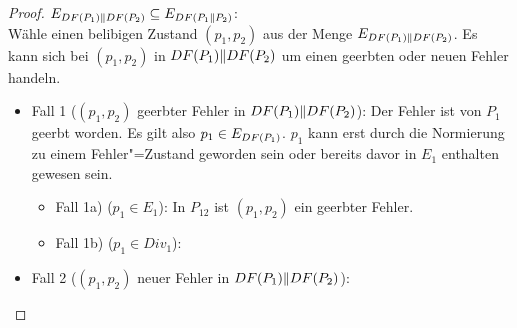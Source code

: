 \begin{proof}
  $E_{DF (P_1)\| DF (P_2)} \subseteq E_{DF (P_1\|P_2)}$:\\
  Wähle einen belibigen Zustand $(p_1,p_2)$ aus der Menge $E_{DF (P_1)\| DF
  (P_2)}$. Es kann sich bei $(p_1,p_2)$ in $DF (P_1)\| DF (P_2)$ um einen
  geerbten oder neuen Fehler handeln.
  \begin{itemize}
    \item Fall 1 ($(p_1,p_2)$ geerbter Fehler in $DF (P_1)\| DF (P_2)$): Der
      Fehler ist \oBdA{} von $P_1$ geerbt worden. Es gilt also $p_1\in E_{DF
      (P_1)}$. $p_1$ kann erst durch die Normierung zu einem Fehler"=Zustand
      geworden sein oder bereits davor in $E_1$ enthalten gewesen sein.
      \begin{itemize}
        \item Fall 1a) ($p_1\in E_1$): In $P_{12}$ ist $(p_1,p_2)$ ein geerbter
          Fehler. 
        \item Fall 1b) ($p_1\in Div_1$): 
      \end{itemize}
    \item Fall 2 ($(p_1,p_2)$ neuer Fehler in $DF (P_1)\| DF (P_2)$):
  \end{itemize}
\end{proof}

